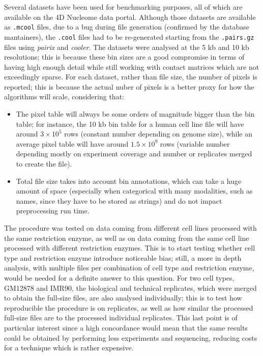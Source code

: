 Several datasets have been used for benchmarking purposes, all of which are available on the 4D Nucleome data portal\cite{4dn2022}. Although those datasets are available as \texttt{.mcool} files, due to a bug during file generation (confirmed by the database mantainers), the \texttt{.cool} files had to be re-generated starting from the \texttt{.pairs.gz} files using \emph{pairix}\cite{pairix2022} and
\emph{cooler}. The datasets were analysed at the 5 kb and 10 kb resolutions; this is because these bin sizes are a good compromise in terms of having high enough detail while still working with contact matrices which are not exceedingly sparse. For each dataset, rather than file size, the number of pixels is reported; this is because the actual nuber of pixels is a better proxy for how the algorithms will scale, considering that: 
\begin{itemize}\tightlist
  \item The pixel table will always be some orders of magnitude bigger than the bin table; for instance, the 10 kb bin table for a human cell line file will have around $3 \times 10^5$ rows (constant number depending on genome size), while an average pixel table will have around $1.5 \times 10^9$ rows (variable number depending mostly on experiment coverage and number or replicates merged to create the file).
  \item Total file size takes into account bin annotations, which can take a huge amount of space (especially when categorical with many modalities, such as names, since they have to be stored as strings) and do not impact preprocessing run time.
\end{itemize}

The procedure was tested on data coming from different cell lines processed with the same restriction enzyme, as well as on data coming from the same cell line processed with different restriction enzymes. This is to start testing whether cell type and restriction enzyme introduce noticeable bias; still, a more in depth analysis, with multiple files per combination of cell type and restriction enzyme, would be needed for a definite answer to this question. For two cell types, GM12878 and IMR90, the biological and technical replicates, which were merged to obtain the full-size files, are also analysed individually; this is to test how reproducible the procedure is on replicates, as well as how similar the processed full-size files are to the processed individual replicates. This last point is of particular interest since a high concordance would mean that the same results could be obtained by performing less experiments and sequencing, reducing costs for a technique which is rather expensive. 

